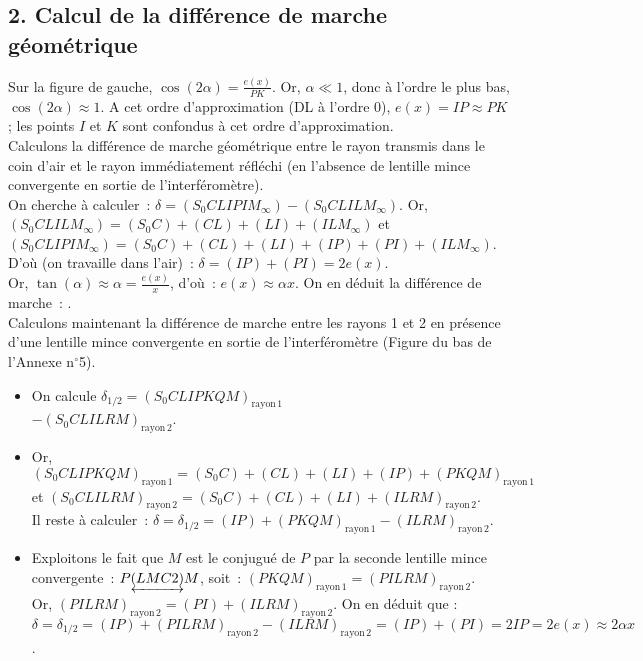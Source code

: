 \documentclass{article}
\newcommand{\mathcolorbox}[2]{\fcolorbox{black}{#1}{$#2$}}
\begin{document}
\subsection*{2.  Calcul de la différence de marche géométrique}
Sur la figure de gauche, $\cos\left(2\alpha\right) =
\frac{e(x)}{PK}$. Or, $\alpha \ll 1$, donc à l'ordre le plus bas,
$\cos\left(2\alpha\right) \approx 1$. A cet ordre d'approximation (DL à l'ordre
0), $e(x)=IP \approx PK$ ; les points $I$ et $K$ sont confondus à
cet ordre d'approximation. \\
Calculons la différence de marche géométrique entre le rayon
transmis dans le coin d'air et le rayon immédiatement réfléchi (en
l'absence de lentille mince convergente en sortie de
l'interféromètre). \\
On cherche à calculer : $\delta =
\left(S_{0}CLIPIM_{\mathrm{\infty}}\right)-\left(S_{0}CLILM_{\mathrm{\infty}}\right)$. Or,
$\left(S_{0}CLILM_{\mathrm{\infty}}\right) = \left(S_{0}C\right) +(CL)+(LI)+\left(ILM_{\mathrm{\infty}}\right)$ et
$\left(S_{0}CLIPIM_{\mathrm{\infty}}\right) =
\left(S_{0}C\right)+(CL)+(LI)+(IP)+(PI)+\left(ILM_{\mathrm{\infty}}\right)$. D'où (on travaille
dans l'air) : $\delta = (IP)+(PI) = 2e(x)$. \\
Or, $\tan\left(\alpha\right) \approx \alpha = \frac{e(x)}{x}$, d'où : $e(x)
\approx \alpha x$. On en déduit la différence de marche :
\mathcolorbox{gray!20}{\delta = 2\alpha x}.
\\
Calculons maintenant la différence de marche entre les rayons 1 et 2
en présence d'une lentille mince convergente en sortie de
l'interféromètre (Figure du bas de l'Annexe n$^{\circ}$5).
\begin{itemize}
\item On calcule $\delta_{\mathrm{1/2}} =
\left(S_{0}CLIPKQM\right)_{\mathrm{rayon\,1}}$\\ $-\left(S_{0}CLILRM\right)_{\mathrm{rayon\,2}}$.
\item Or,
$\left(S_{0}CLIPKQM\right)_{\mathrm{rayon\,1}} =
\left(S_{0}C\right)+(CL)+(LI)+(IP)+(PKQM)_{\mathrm{rayon\,1}}$ et
$\left(S_{0}CLILRM\right)_{\mathrm{rayon\,2}} = \left(S_{0}C\right)+(CL)+(LI)+(ILRM)_{\mathrm{rayon\,2}}$.
\\ Il reste à calculer : $\delta = \delta_{\mathrm{1/2}} =
(IP)+(PKQM)_{\mathrm{rayon\,1}} - (ILRM)_{\mathrm{rayon\,2}}$.
\item Exploitons le fait que $M$ est le conjugué de $P$ par la
seconde lentille mince convergente : $P
\underleftrightarrow{(LMC2)}M$, soit : $(PKQM)_{\mathrm{rayon\,1}} =
\left(PILRM\right)_{\mathrm{rayon\,2}}$. \\
Or, $\left(PILRM\right)_{\mathrm{rayon\,2}} = (PI)+(ILRM)_{\mathrm{rayon\,2}}$. On en déduit que
: $\delta = \delta_{\mathrm{1/2}} = (IP)+\left(PILRM\right)_{\mathrm{rayon\,2}} -
(ILRM)_{\mathrm{rayon\,2}} = (IP)+(PI) = 2IP = 2e(x) \approx 2\alpha x$.
\end{itemize}
\end{document}
